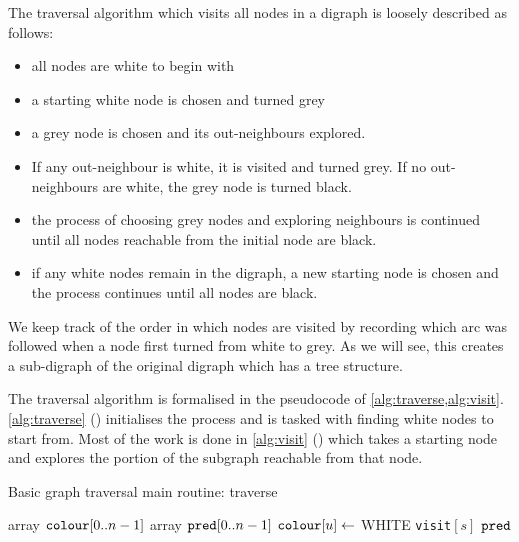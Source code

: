 The traversal algorithm which visits all nodes in a digraph is loosely described as follows: 
\begin{itemize}
\item all nodes are white to begin with
\item a starting white node is chosen and turned grey
\item a grey node is chosen and its out-neighbours explored. 
\item If any out-neighbour is white, it is visited and turned grey. If no out-neighbours are white, the grey node is turned black. 
\item the process of choosing grey nodes and exploring neighbours is continued until all nodes reachable from the initial node are black.
\item if any white nodes remain in the digraph, a new  starting node is chosen and the process continues until all nodes are black.
\end{itemize}

We keep track of the order in which nodes are visited by recording which arc was followed when a node first turned from white to grey. As we will see, this creates a sub-digraph of the original digraph which has a tree structure.

The traversal algorithm is formalised in the pseudocode  of \cref{alg:traverse,alg:visit}. \cref{alg:traverse} () initialises the process and is tasked with finding white nodes to start from. Most of the work is done in \cref{alg:visit} () which takes a starting node and explores the portion of the subgraph reachable from that node.

\begin{algorithm}[H]
  \caption{Basic graph traversal main routine: traverse
    \label{alg:traverse}}
\begin{algorithmic}[1]
	\State  array $\colour[0..n-1]$ 
	\State array $\pred[0..n-1]$ 
	 
		\State $\colour[u] \gets $ WHITE 
	\EndFor
	  
			\State \texttt{visit}$[s]$ 
		\EndIf
	\EndFor
	\Return $\pred$ 
\EndFunction
\end{algorithmic}
\end{algorithm}


